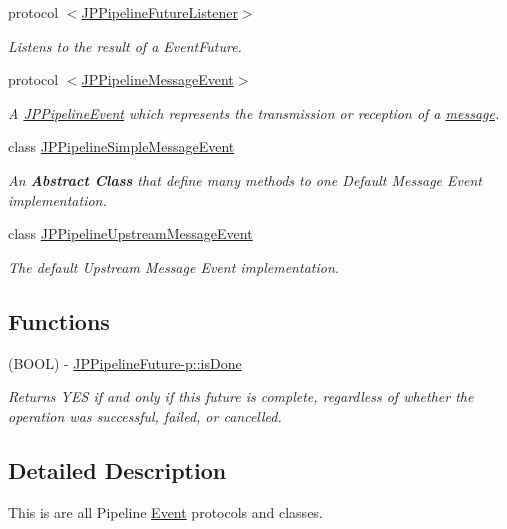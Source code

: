 \begin{DoxyCompactItemize}
protocol \hyperlink{a00028}{$<$JPPipelineFutureListener$>$}
\begin{DoxyCompactList}\small\item\em Listens to the result of a EventFuture. \item\end{DoxyCompactList}\item 
protocol \hyperlink{a00031}{$<$JPPipelineMessageEvent$>$}
\begin{DoxyCompactList}\small\item\em A \hyperlink{a00023}{JPPipelineEvent} which represents the transmission or reception of a \hyperlink{a00006}{message}. \item\end{DoxyCompactList}\item 
class \hyperlink{a00033}{JPPipelineSimpleMessageEvent}
\begin{DoxyCompactList}\small\item\em An {\bfseries Abstract Class} that define many methods to one Default Message Event implementation. \item\end{DoxyCompactList}\item 
class \hyperlink{a00036}{JPPipelineUpstreamMessageEvent}
\begin{DoxyCompactList}\small\item\em The default Upstream Message Event implementation. \item\end{DoxyCompactList}\end{DoxyCompactItemize}
\subsection*{Functions}
\begin{DoxyCompactItemize}
\item 
\hypertarget{a00085_ga41065d3dada7633eef9dd75b1794511b}{
(BOOL) -\/ \hyperlink{a00085_ga41065d3dada7633eef9dd75b1794511b}{JPPipelineFuture-\/p::isDone}}
\label{a00085_ga41065d3dada7633eef9dd75b1794511b}

\begin{DoxyCompactList}\small\item\em Returns YES if and only if this future is complete, regardless of whether the operation was successful, failed, or cancelled. \item\end{DoxyCompactList}\end{DoxyCompactItemize}


\subsection{Detailed Description}
This is are all Pipeline \hyperlink{a00005}{Event} protocols and classes. 